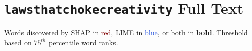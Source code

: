 \documentclass[10pt,letterpaper]{article}
\begin{document}
\newpage

\section{\texttt{lawsthatchokecreativity} Full Text} \label{sec:laws_text}

Words discovered by SHAP in \textcolor{Maroon}{red}, LIME in \textcolor{RoyalBlue}{blue}, or both in \textbf{bold}. Threshold based on $75^{th}$ percentile word ranks.

\vspace{1em}
\noindent
\begin{minipage}{\textwidth}
\ssmall %
\begin{spacing}{1.0} %

\end{spacing}
\end{minipage}
\vspace{1em}
\end{document}
